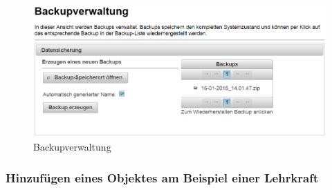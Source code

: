 \documentclass[fontsize=12pt]{scrartcl}
\begin{document}
\begin{figure}[H]
\includegraphics[width=\textwidth]{images/backupManagement.png}
\caption{Backupverwaltung}
\end{figure}

\subsubsection{Hinzufügen eines Objektes am Beispiel einer Lehrkraft}
\end{document}
